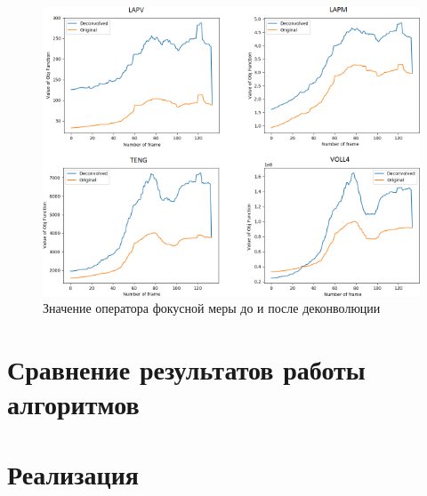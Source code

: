 \documentclass[14pt]{matmex-diploma-custom}
\begin{document}
\begin{figure}[h]
\centering
\includegraphics[width=1.0\textwidth]{figures/deconvolution2.png}
\caption{Значение оператора фокусной меры до и после деконволюции}
\label{deconvolution2}
\end{figure}


\section{Сравнение результатов работы алгоритмов}

\section{Реализация}


\setmonofont[Mapping=tex-text]{CMU Typewriter Text}


\end{document}
